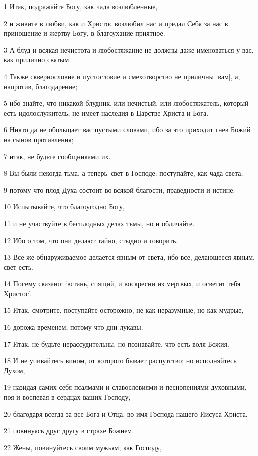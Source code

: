 \par 1 Итак, подражайте Богу, как чада возлюбленные,
\par 2 и живите в любви, как и Христос возлюбил нас и предал Себя за нас в приношение и жертву Богу, в благоухание приятное.
\par 3 А блуд и всякая нечистота и любостяжание не должны даже именоваться у вас, как прилично святым.
\par 4 Также сквернословие и пустословие и смехотворство не приличны [вам], а, напротив, благодарение;
\par 5 ибо знайте, что никакой блудник, или нечистый, или любостяжатель, который есть идолослужитель, не имеет наследия в Царстве Христа и Бога.
\par 6 Никто да не обольщает вас пустыми словами, ибо за это приходит гнев Божий на сынов противления;
\par 7 итак, не будьте сообщниками их.
\par 8 Вы были некогда тьма, а теперь--свет в Господе: поступайте, как чада света,
\par 9 потому что плод Духа состоит во всякой благости, праведности и истине.
\par 10 Испытывайте, что благоугодно Богу,
\par 11 и не участвуйте в бесплодных делах тьмы, но и обличайте.
\par 12 Ибо о том, что они делают тайно, стыдно и говорить.
\par 13 Все же обнаруживаемое делается явным от света, ибо все, делающееся явным, свет есть.
\par 14 Посему сказано: `встань, спящий, и воскресни из мертвых, и осветит тебя Христос'.
\par 15 Итак, смотрите, поступайте осторожно, не как неразумные, но как мудрые,
\par 16 дорожа временем, потому что дни лукавы.
\par 17 Итак, не будьте нерассудительны, но познавайте, что есть воля Божия.
\par 18 И не упивайтесь вином, от которого бывает распутство; но исполняйтесь Духом,
\par 19 назидая самих себя псалмами и славословиями и песнопениями духовными, поя и воспевая в сердцах ваших Господу,
\par 20 благодаря всегда за все Бога и Отца, во имя Господа нашего Иисуса Христа,
\par 21 повинуясь друг другу в страхе Божием.
\par 22 Жены, повинуйтесь своим мужьям, как Господу,
